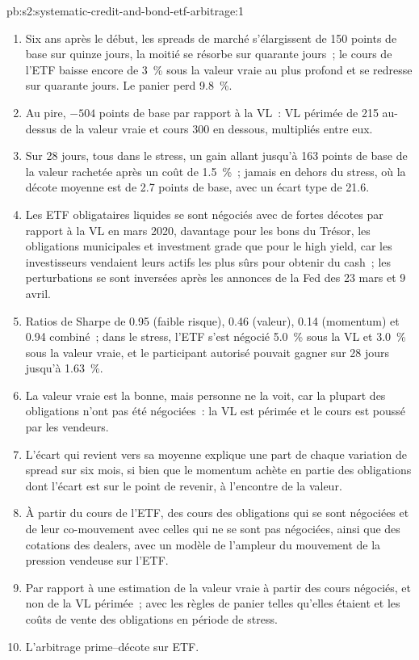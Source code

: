 \begin{solution}{pb:s2:systematic-credit-and-bond-etf-arbitrage:1}
\begin{enumerate}
\item Six ans après le début, les spreads de marché s'élargissent de 150 points de base sur quinze jours, la moitié se résorbe sur quarante jours~; le cours de l'ETF baisse encore de 3~\% sous
la valeur vraie au plus profond et se redresse sur quarante jours. Le panier perd 9.8~\%.
\item Au pire, $-504$ points de base par rapport à la VL~: VL périmée de 215 au-dessus de la valeur vraie et cours 300 en dessous, multipliés entre eux.
\item Sur 28 jours, tous dans le stress, un gain allant jusqu'à 163 points de base de la valeur rachetée après un coût de 1.5~\%~; jamais en dehors du stress, où la
décote moyenne est de 2.7 points de base, avec un écart type de 21.6.
\item Les ETF obligataires liquides se sont négociés avec de fortes décotes par rapport à la VL en mars 2020, davantage pour les bons du Trésor, les obligations municipales et investment grade que pour le high yield, car les investisseurs vendaient leurs actifs les plus sûrs pour obtenir du cash~; les
perturbations se sont inversées après les annonces de la Fed des 23 mars et 9 avril.
\item Ratios de Sharpe de 0.95 (faible risque), 0.46 (valeur), 0.14 (momentum) et 0.94 combiné~; dans le stress, l'ETF s'est négocié 5.0~\% sous la VL et 3.0~\% sous
la valeur vraie, et le participant autorisé pouvait gagner sur 28 jours jusqu'à 1.63~\%.
\item La valeur vraie est la bonne, mais personne ne la voit, car la plupart des obligations n'ont pas été négociées~: la VL est périmée et le cours est poussé par les vendeurs.
\item L'écart qui revient vers sa moyenne explique une part de chaque variation de spread sur six mois, si bien que le momentum achète en partie des obligations dont l'écart est sur le point de revenir, à l'encontre de la valeur.
\item À partir du cours de l'ETF, des cours des obligations qui se sont négociées et de leur co-mouvement avec celles qui ne se sont pas négociées, ainsi que des cotations des dealers, avec un modèle de l'ampleur
du mouvement de la pression vendeuse sur l'ETF.
\item Par rapport à une estimation de la valeur vraie à partir des cours négociés, et non de la VL périmée~; avec les règles de panier telles qu'elles étaient et les coûts de vente des obligations en période de stress.
\item L'arbitrage prime--décote sur ETF.

\end{enumerate}
\end{solution}
